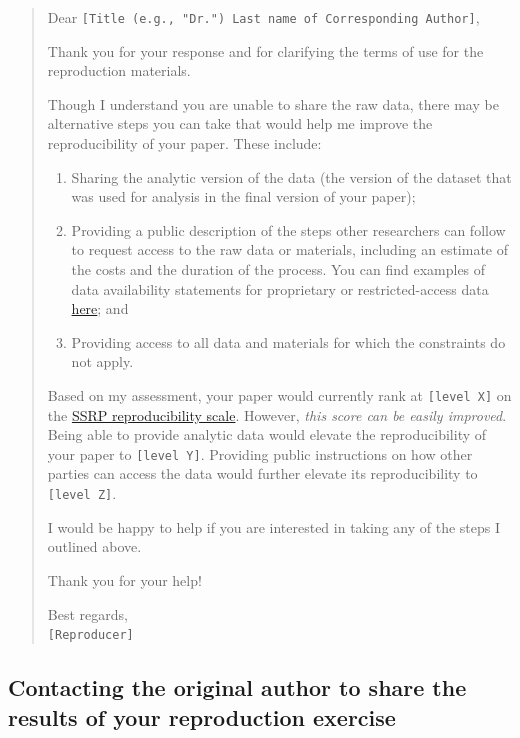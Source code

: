 \documentclass[]{book}
\providecommand{\tightlist}{%
  \setlength{\itemsep}{0pt}\setlength{\parskip}{0pt}}
\begin{document}
\begin{quote}
Dear \texttt{{[}Title\ (e.g.,\ "Dr.")\ Last\ name\ of\ Corresponding\ Author{]}},

Thank you for your response and for clarifying the terms of use for the reproduction materials.

Though I understand you are unable to share the raw data, there may be alternative steps you can take that would help me improve the reproducibility of your paper. These include:

\begin{enumerate}
\def\labelenumi{\arabic{enumi}.}
\tightlist
\item
  Sharing the analytic version of the data (the version of the dataset that was used for analysis in the final version of your paper);\\
\item
  Providing a public description of the steps other researchers can follow to request access to the raw data or materials, including an estimate of the costs and the duration of the process. You can find examples of data availability statements for proprietary or restricted-access data \href{https://social-science-data-editors.github.io/guidance/Requested_information_dcas.html}{here}; and\\
\item
  Providing access to all data and materials for which the constraints do not apply.
\end{enumerate}

Based on my assessment, your paper would currently rank at \texttt{{[}level\ X{]}} on the \href{https://bitss.github.io/ACRE/assessment.html\#levels-of-computational-reproducibility-for-a-specific-output}{SSRP reproducibility scale}. However, \emph{this score can be easily improved}. Being able to provide analytic data would elevate the reproducibility of your paper to \texttt{{[}level\ Y{]}}. Providing public instructions on how other parties can access the data would further elevate its reproducibility to \texttt{{[}level\ Z{]}}.

I would be happy to help if you are interested in taking any of the steps I outlined above.

Thank you for your help!

Best regards,\\
\texttt{{[}Reproducer{]}}
\end{quote}

\hypertarget{contacting-the-original-author-to-share-the-results-of-your-reproduction-exercise}{%
\subsection{Contacting the original author to share the results of your reproduction exercise}\label{contacting-the-original-author-to-share-the-results-of-your-reproduction-exercise}}
\end{document}
